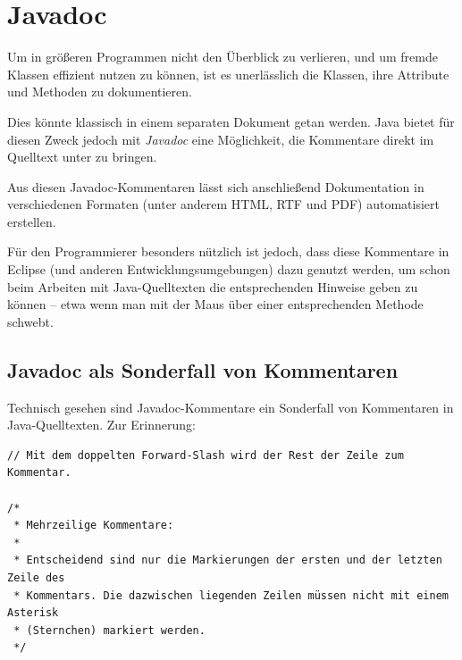 \chapter{Javadoc}
\renewcommand{\chaptertitle}{Javadoc}

\lehead[]{\normalfont\sffamily\hspace*{-2.00cm}\textcolor{white}{\colorbox{lightblue}{\makebox[1.60cm][r]{\thechapter}}}\hspace{0.17cm}\textcolor{lightblue}{\chaptertitle}}
\rohead[]{\textcolor{lightblue}{\chaptertitle}\normalfont\sffamily\hspace*{0.17cm}\textcolor{white}{\colorbox{lightblue}{\makebox[1.60cm][l]{\thechapter}}}\hspace{-2.00cm}}
\rehead[]{\textcolor{lightblue}{AvHG, Inf, My}}
\lohead[]{\textcolor{lightblue}{AvHG, Inf, My}}

\lstset{style=myJava}

Um in größeren Programmen nicht den Überblick zu verlieren, und um fremde
Klassen effizient nutzen zu können, ist es unerlässlich die Klassen, ihre
Attribute und Methoden zu dokumentieren.

Dies könnte klassisch in einem separaten Dokument getan werden. Java bietet für
diesen Zweck jedoch mit {\em Javadoc} eine Möglichkeit, die Kommentare direkt im
Quelltext unter zu bringen.

Aus diesen Javadoc-Kommentaren lässt sich anschließend Dokumentation in
verschiedenen Formaten (unter anderem HTML, RTF und PDF) automatisiert
erstellen.

Für den Programmierer besonders nützlich ist jedoch, dass diese Kommentare in
Eclipse (und anderen Entwicklungsumgebungen) dazu genutzt werden, um schon beim
Arbeiten mit Java-Quelltexten die entsprechenden Hinweise geben zu können --
etwa wenn man mit der Maus über einer entsprechenden Methode schwebt.


\section{Javadoc als Sonderfall von Kommentaren}

Technisch gesehen sind Javadoc-Kommentare ein Sonderfall von Kommentaren in
Java-Quelltexten. Zur Erinnerung:

\begin{lstlisting}
// Mit dem doppelten Forward-Slash wird der Rest der Zeile zum Kommentar.

/* 
 * Mehrzeilige Kommentare:
 *
 * Entscheidend sind nur die Markierungen der ersten und der letzten Zeile des
 * Kommentars. Die dazwischen liegenden Zeilen müssen nicht mit einem Asterisk
 * (Sternchen) markiert werden.
 */
\end{lstlisting}

